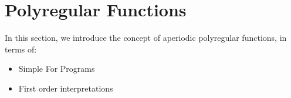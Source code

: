 \section{Polyregular Functions}
\label{sec:polyregular}

In this section, we introduce the concept of aperiodic polyregular functions,
in terms of:
\begin{itemize}
    \item Simple For Programs
    \item First order interpretations
\end{itemize}
